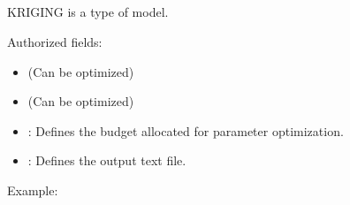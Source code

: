 \documentclass[letterpaper,10pt,english]{sphinxmanual}
\begin{document}
\subsection{}
\label{\detokenize{SgteLib:kriging}}\label{\detokenize{SgteLib:id6}}
\begin{DUlineblock}{0em}
\item[] KRIGING is a type of model.
\item[] Authorized fields:
\end{DUlineblock}
\begin{itemize}
\item {} 
\sphinxAtStartPar
{\hyperref[\detokenize{SgteLib:ridge}]{}} (Can be optimized)

\item {} 
\sphinxAtStartPar
{\hyperref[\detokenize{SgteLib:distance-type}]{}} (Can be optimized)

\item {} 
\sphinxAtStartPar
{\hyperref[\detokenize{SgteLib:budget}]{}}: Defines the budget allocated for parameter optimization.

\item {} 
\sphinxAtStartPar
{\hyperref[\detokenize{SgteLib:output}]{}}: Defines the output text file.

\end{itemize}

\begin{DUlineblock}{0em}
\item[] Example:
\item[] 
\end{DUlineblock}
\end{document}
